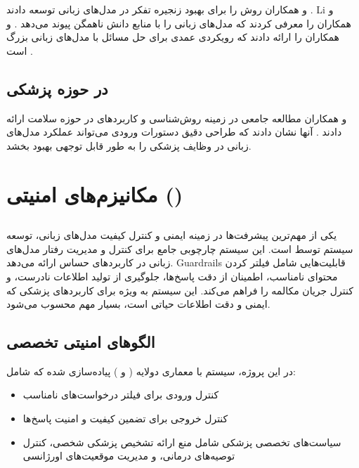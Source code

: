 \documentclass[11pt, a4paper, oneside]{book}
\begin{document}
	 و همکاران روش  را برای بهبود زنجیره تفکر در مدل‌های زبانی توسعه دادند \cite{wang_self-consistency_2023}. Li و همکاران  را معرفی کردند که مدل‌های زبانی را با منابع دانش ناهمگن پیوند می‌دهد \cite{li_chain--knowledge_2024}.  و همکاران  را ارائه دادند که رویکردی عمدی برای حل مسائل با مدل‌های زبانی بزرگ است \cite{yao_tree_2023}.
	
	\subsection{ در حوزه پزشکی}
	
	 و همکاران مطالعه جامعی در زمینه روش‌شناسی و کاربردهای  در حوزه سلامت ارائه دادند \cite{wang_prompt_2024}. آنها نشان دادند که طراحی دقیق دستورات ورودی می‌تواند عملکرد مدل‌های زبانی در وظایف پزشکی را به طور قابل توجهی بهبود بخشد.
	
	\section{مکانیزم‌های امنیتی ()}
	
	\subsection{}
	
	یکی از مهم‌ترین پیشرفت‌ها در زمینه ایمنی و کنترل کیفیت مدل‌های زبانی، توسعه سیستم  توسط  است. این سیستم چارچوبی جامع برای کنترل و مدیریت رفتار مدل‌های زبانی در کاربردهای حساس ارائه می‌دهد. Guardrails قابلیت‌هایی شامل فیلتر کردن محتوای نامناسب، اطمینان از دقت پاسخ‌ها، جلوگیری از تولید اطلاعات نادرست، و کنترل جریان مکالمه را فراهم می‌کند. این سیستم به ویژه برای کاربردهای پزشکی که ایمنی و دقت اطلاعات حیاتی است، بسیار مهم محسوب می‌شود.
	
	\subsection{الگوهای امنیتی تخصصی}
	
	در این پروژه، سیستم  با معماری دولایه ( و ) پیاده‌سازی شده که شامل:
	\begin{itemize}
		\item کنترل ورودی برای فیلتر درخواست‌های نامناسب
		\item کنترل خروجی برای تضمین کیفیت و امنیت پاسخ‌ها
		\item سیاست‌های تخصصی پزشکی شامل منع ارائه تشخیص پزشکی شخصی، کنترل توصیه‌های درمانی، و مدیریت موقعیت‌های اورژانسی
	\end{itemize}
	
\end{document}
